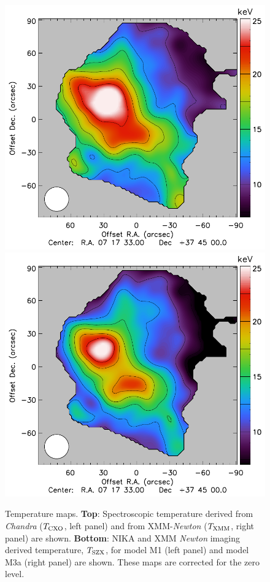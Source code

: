 \documentclass[twocolumn,traditabstract]{aa}
\def\TSZ {T_{\rm SZX}}
\def \TXC {T_{\rm CXO}}
\def \TXX {T_{\rm XMM}}
\begin{document}
\begin{figure}[h]
\includegraphics[trim=0cm 0cm 1.4cm 0cm, clip=true, totalheight=7.6cm]{Figure/Thermo_TSZclean1.pdf}
\includegraphics[trim=0cm 0cm 0cm 0cm, clip=true, totalheight=7.6cm]{Figure/Thermo_TSZclean8.pdf}
\caption{\footnotesize{Temperature maps. {\bf Top}: Spectroscopic temperature derived from \textit{Chandra} ($\TXC$, left panel) and from XMM-\textit{Newton} ($\TXX$, right panel) are shown. {\bf Bottom}: NIKA and XMM \textit{Newton} imaging derived temperature, $\TSZ$, for model M1 (left panel) and model M3a (right panel) are shown. These maps are corrected for the zero level.}}
\label{fig:T_maps}
\end{figure}
\end{document}
